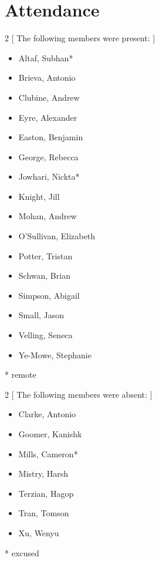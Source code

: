 \section*{Attendance}

\begin{multicols}{2}
    [
        The following members were present:
    ]
\begin{itemize}
    \item Altaf, Subhan*
    \item Brieva, Antonio
    \item Clubine, Andrew
    \item Eyre, Alexander
    \item Easton, Benjamin
    \item George, Rebecca
    \item Jowhari, Nickta* 
    \item Knight, Jill
    \item Mohan, Andrew
    \item O'Sullivan, Elizabeth
    \item Potter, Tristan
    \item Schwan, Brian
    \item Simpson, Abigail
    \item Small, Jason
    \item Velling, Seneca
    \item Ye-Mowe, Stephanie
\end{itemize}

\end{multicols}
* remote \\

\begin{multicols}{2}
    [
        The following members were absent:
    ]
\begin{itemize}
    \item Clarke, Antonio
    \item Goomer, Kanishk
    \item Mills, Cameron*
    \item Mistry, Harsh
    \item Terzian, Hagop
    \item Tran, Tomson
    \item Xu, Wenyu
\end{itemize}
\end{multicols}
* excused\\



